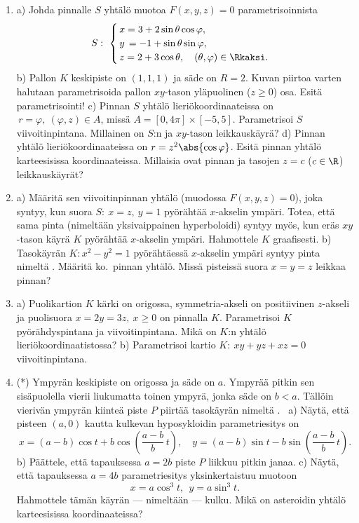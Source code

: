 \begin{enumerate}
\item
a) Johda pinnalle $S$ yhtälö muotoa $F(x,y,z)=0$ parametrisoinnista
\[ 
S:\ \begin{cases}
    \,x=3+2\sin\theta\cos\varphi, \\
    \,y\,=-1+\sin\theta\sin\varphi, \\
    \,z=2+3\cos\theta, \quad (\theta,\varphi)\in\Rkaksi.
    \end{cases}
\]
b) Pallon $K$ keskipiste on $(1,1,1)$ ja säde on $R=2$. Kuvan piirtoa varten halutaan
parametrisoida pallon $xy$-tason yläpuolinen ($z \ge 0$) osa. Esitä parametrisointi!
\vspace{1mm}\newline
c) Pinnan $S$ yhtälö lieriökoordinaateissa on $\,r=\varphi,\ (\varphi,z) \in A$, missä
$A=[0,4\pi]\times[-5,5]$. Parametrisoi $S$ viivoitinpintana. Millainen on $S$:n ja
$xy$-tason leikkauskäyrä? \vspace{1mm}\newline
d) Pinnan yhtälö lieriökoordinaateissa on $r=z^2\abs{\cos\varphi}$. Esitä pinnan yhtälö
karteesisissa koordinaateissa. Millaisia ovat pinnan ja tasojen $z=c$ ($c\in\R$)
leikkauskäyrät?

\item {} 
a) Määritä sen viivoitinpinnan yhtälö (muodossa $F(x,y,z)=0$), joka syntyy, kun suora
$S:\ x=z,\ y=1$ pyörähtää $x$-akselin ympäri. Totea, että sama pinta (nimeltään yksivaippainen
hyperboloidi) syntyy myös, kun eräs $xy$-tason käyrä $K$ pyörähtää $x$-akselin ympäri. 
Hahmottele $K$ graafisesti. \vspace{1mm}\newline 
b) Tasokäyrän $K: x^2-y^2=1$ pyörähtäessä $x$-akselin ympäri syntyy pinta nimeltä
. Määritä ko.\ pinnan yhtälö. Missä pisteissä suora
$x=y=z$ leikkaa pinnan?

\item
a) Puolikartion $K$ kärki on origossa, symmetria-akseli on positiivinen $z$-akseli ja
puolisuora $x=2y=3z,\ x \ge 0$ on pinnalla $K$. Parametrisoi $K$ pyörähdyspintana ja
viivoitinpintana. Mikä on $K$:n yhtälö lieriökoordinaatistossa? \vspace{1mm}\newline
b) Parametrisoi kartio $K:\ xy+yz+xz=0\,$ viivoitinpintana.

\item (*)  
Ympyrän keskipiste on origossa ja säde on $a$. Ympyrää pitkin sen sisäpuolella vierii liukumatta
toinen ympyrä, jonka säde on $b<a$. Tällöin vierivän ympyrän kiinteä piste $P$ piirtää 
tasokäyrän nimeltä . \ a) Näytä, että pisteen $(a,0)$ kautta kulkevan
hyposykloidin parametriesitys on
\[
x=(a-b)\cos t+b\cos\left(\frac{a-b}{b}\,t\right), \quad
y=(a-b)\sin t-b\sin\left(\frac{a-b}{b}\,t\right).
\]
b) Päättele, että tapauksessa $a=2b$ piste $P$ liikkuu pitkin janaa. \newline
c) Näytä, että tapauksessa $a=4b$ parametriesitys yksinkertaistuu muotoon 
\[
x=a\cos^3 t,\ \ y=a\sin^3 t.
\] 
Hahmottele tämän käyrän --- nimeltään  --- kulku. Mikä on asteroidin yhtälö
karteesisissa koordinaateissa? 


\end{enumerate}
